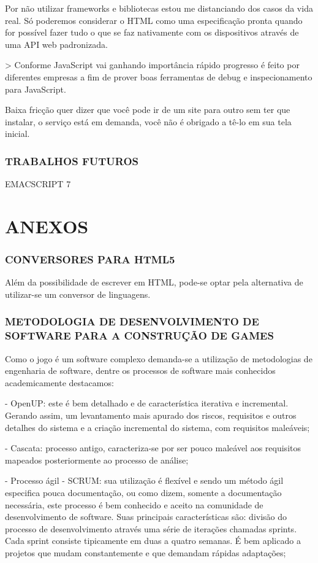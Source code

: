 \documentclass[11pt,a4paper]{article}
\begin{document}
Por não utilizar frameworks e bibliotecas estou me distanciando
dos casos da vida real. Só poderemos considerar o HTML como uma
especificação pronta quando
for possível fazer tudo o que se faz nativamente com os dispositivos
através de uma API web padronizada.

> Conforme JavaScript vai ganhando importância rápido progresso é
feito por diferentes empresas a fim de prover boas ferramentas de debug
e inspecionamento para JavaScript.

Baixa fricção quer dizer que você pode ir de um site para outro sem
ter que instalar, o serviço está em demanda, você não é obrigado a
tê-lo em sua tela inicial.


\subsection{ TRABALHOS FUTUROS}

EMACSCRIPT 7


\chapter{ANEXOS}

\subsection{ CONVERSORES PARA HTML5}
Além da possibilidade de escrever em HTML, pode-se optar pela
alternativa de utilizar-se um conversor de linguagens.

\subsection{ METODOLOGIA DE DESENVOLVIMENTO DE SOFTWARE PARA A CONSTRUÇÃO DE GAMES}

Como o jogo é um software complexo demanda-se a utilização de
metodologias de engenharia de software, dentre os processos de software
mais conhecidos academicamente destacamos:

- OpenUP: este é bem detalhado e de característica iterativa e
incremental. Gerando assim, um levantamento mais apurado dos riscos,
requisitos e outros detalhes do sistema e a criação incremental do
sistema, com requisitos maleáveis;

- Cascata: processo antigo, caracteriza-se por ser pouco maleável aos
requisitos mapeados posteriormente ao processo de análise;

- Processo ágil - SCRUM: sua utilização é flexível e sendo
um método ágil especifica pouca documentação, ou como dizem,
somente a documentação necessária, este processo é bem conhecido e
aceito na comunidade de desenvolvimento de software. Suas principais
características são: divisão do processo de desenvolvimento através
uma série de iterações chamadas sprints. Cada sprint consiste
tipicamente em duas a quatro semanas. É bem aplicado a projetos que
mudam constantemente e que demandam rápidas adaptações;
\end{document}
